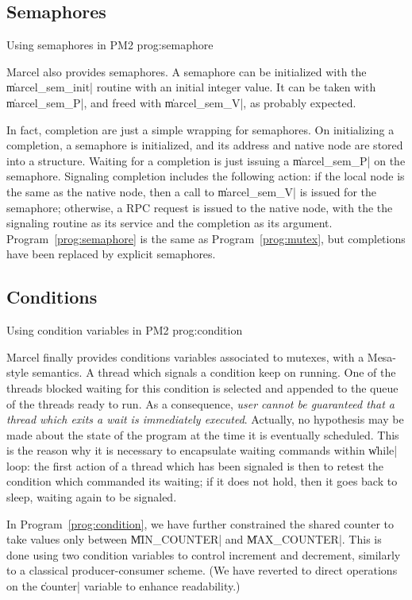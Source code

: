 \subsection{Semaphores}

 {Using semaphores in PM2}
{prog:semaphore}

Marcel also provides semaphores. A semaphore can be initialized with
the \|marcel_sem_init| routine with an initial integer value. It can
be taken with \|marcel_sem_P|, and freed with \|marcel_sem_V|, as
probably expected.

In fact, completion are just a simple wrapping for semaphores. On
initializing a completion, a semaphore is initialized, and its address
and native node are stored into a structure. Waiting for a completion
is just issuing a \|marcel_sem_P| on the semaphore.  Signaling
completion includes the following action: if the local node is the
same as the native node, then a call to \|marcel_sem_V| is issued for
the semaphore; otherwise, a RPC request is issued to the native node,
with the the signaling routine as its service and the completion as
its argument. Program~\ref{prog:semaphore} is the same as
Program~\ref{prog:mutex}, but completions have been replaced by
explicit semaphores.

\subsection{Conditions}

 {Using condition variables in PM2}
 {prog:condition}

Marcel finally provides conditions variables associated to mutexes,
with a Mesa-style semantics. A thread which signals a condition keep
on running. One of the threads blocked waiting for this condition is
selected and appended to the queue of the threads ready to run. As a
consequence, \emph{user cannot be guaranteed that a thread which exits
  a wait is immediately executed}. Actually, no hypothesis may be made
about the state of the program at the time it is eventually
scheduled. This is the reason why it is necessary to encapsulate
waiting commands within \|while| loop: the first action of a thread
which has been signaled is then to retest the condition which
commanded its waiting; if it does not hold, then it goes back to
sleep, waiting again to be signaled.

In Program~\ref{prog:condition}, we have further constrained the
shared counter to take values only between \|MIN_COUNTER| and
\|MAX_COUNTER|. This is done using two condition variables
to control increment and decrement, similarly to a classical
producer-consumer scheme. (We have reverted to direct operations on
the \|counter| variable to enhance readability.) 

